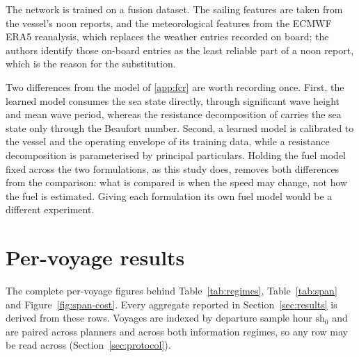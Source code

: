\documentclass[review,authoryear]{elsarticle}
\begin{document}
The network is trained on a fusion dataset. The sailing features are taken from the vessel's noon
reports, and the meteorological features from the ECMWF ERA5 reanalysis, which replaces the weather
entries recorded on board; the authors identify those on-board entries as the least reliable part of a
noon report, which is the reason for the substitution.

Two differences from the model of \ref{app:fcr} are worth recording once. First, the learned
model consumes the sea state directly, through significant wave height and mean wave period, whereas
the resistance decomposition of \citet{yang2020} carries the sea state only through the Beaufort
number. Second, a learned model is calibrated to the vessel and the operating envelope of its training
data, while a resistance decomposition is parameterised by principal particulars. Holding the fuel
model fixed across the two formulations, as this study does, removes both differences from the
comparison: what is compared is when the speed may change, not how the fuel is estimated. Giving each
formulation its own fuel model would be a different experiment.


\section{Per-voyage results}
\label{app:pervoyage}

The complete per-voyage figures behind Table~\ref{tab:regimes}, Table~\ref{tab:span} and
Figure~\ref{fig:span-cost}. Every aggregate reported in Section~\ref{sec:results} is derived from
these rows. Voyages are indexed by departure sample hour $\mathrm{sh}_0$ and are paired across
planners and across both information regimes, so any row may be read across
(Section~\ref{sec:protocol}).
\end{document}
